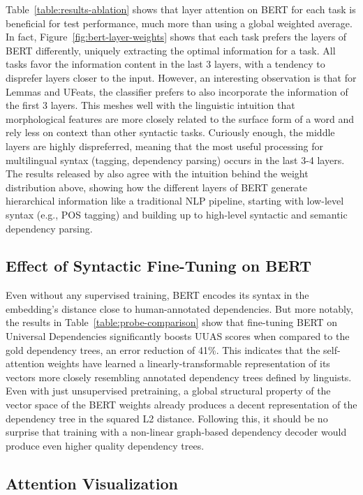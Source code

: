 \documentclass[11pt,a4paper]{article}
\begin{document}
Table~\ref{table:results-ablation} shows that layer attention on BERT for each task is beneficial for test performance, much more than using a global weighted average.
In fact, Figure~\ref{fig:bert-layer-weights} shows that each task prefers the layers of BERT differently, uniquely extracting the optimal information for a task.
All tasks favor the information content in the last 3 layers, with a tendency to disprefer layers closer to the input.
However, an interesting observation is that for Lemmas and UFeats, the classifier prefers to also incorporate the information of the first 3 layers.
This meshes well with the linguistic intuition that morphological features are more closely related to the surface form of a word and rely less on context than other syntactic tasks.
Curiously enough, the middle layers are highly dispreferred, meaning that the most useful processing for multilingual syntax (tagging, dependency parsing) occurs in the last 3-4 layers.
The results released by  also agree with the intuition behind the weight distribution above, showing how the different layers of BERT generate hierarchical information like a traditional NLP pipeline, starting with low-level syntax (e.g., POS tagging) and building up to high-level syntactic and semantic dependency parsing.

\subsection{Effect of Syntactic Fine-Tuning on BERT}

Even without any supervised training, BERT encodes its syntax in the embedding's distance close to human-annotated dependencies. But more notably, the results in Table~\ref{table:probe-comparison} show that fine-tuning BERT on Universal Dependencies significantly boosts UUAS scores when compared to the gold dependency trees, an error reduction of 41\%.
This indicates that the self-attention weights have learned a linearly-transformable representation of its vectors more closely resembling annotated dependency trees defined by linguists.
Even with just unsupervised pretraining, a global structural property of the vector space of the BERT weights already produces a decent representation of the dependency tree in the squared L2 distance.
Following this, it should be no surprise that training with a non-linear graph-based dependency decoder would produce even higher quality dependency trees.



\subsection{Attention Visualization}
\end{document}
